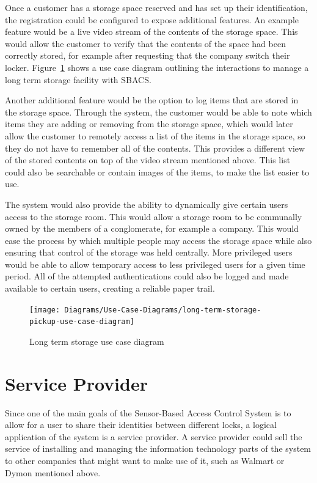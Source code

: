 \documentclass[12pt]{report}
\let\Oldsection\section
\renewcommand{\section}{\FloatBarrier\Oldsection}
\begin{document}
Once a customer has a storage space reserved and has set up their identification, the registration could be configured
to expose additional features. An example feature would be a live video stream of the contents of the storage space.
This would allow the customer to verify that the contents of the space had been correctly stored, for example after
requesting that the company switch their locker. Figure~\ref{fig:long-term-storage-pickup-use-case-diagram} shows
a use case diagram outlining the interactions to manage a long term storage facility with SBACS.

Another additional feature would be the option to log items that are stored in the storage space. Through the system, the
customer would be able to note which items they are adding or removing from the storage space, which would later allow the
customer to remotely access a list of the items in the storage space, so they do not have to remember all of the contents.
This provides a different view of the stored contents on top of the video stream mentioned above. This list could also be
searchable or contain images of the items, to make the list easier to use.

The system would also provide the ability to dynamically give certain users access to the storage room. This would allow
a storage room to be communally owned by the members of a conglomerate, for example a company. This would ease the
process by which multiple people may access the storage space while also ensuring that control of the storage was held
centrally. More privileged users would be able to allow temporary access to less privileged users for a given time
period. All of the attempted authentications could also be logged and made available to certain users, creating a
reliable paper trail.

\begin{figure}
    \texttt{[image: Diagrams/Use-Case-Diagrams/long-term-storage-pickup-use-case-diagram]}
    \caption{Long term storage use case diagram}
    \label{fig:long-term-storage-pickup-use-case-diagram}
\end{figure}


\section{Service Provider} \label{service-provider}

Since one of the main goals of the Sensor-Based Access Control System is to allow for a user to share their identities
between different locks, a logical application of the system is a service provider. A service provider could sell the service
of installing and managing the information technology parts of the system to other companies that might want to
make use of it, such as Walmart or Dymon mentioned above.
\end{document}
